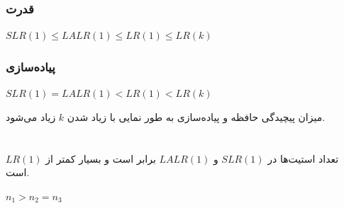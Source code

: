 \documentclass{article}
\begin{document}
\section{}%
\subsection{}
\subsubsection{قدرت}
\begin{latin}
$
SLR(1) \le LALR(1) \le LR(1) \le LR(k)
$
\end{latin}
\subsubsection{پیاده‌سازی}
\begin{latin}
$
SLR(1) = LALR(1) < LR(1) < LR(k)
$
\end{latin}
میزان پیچیدگی حافظه و پیاده‌سازی به طور نمایی با زیاد شدن $k$ زیاد می‌شود.


\section{}%
تعداد استیت‌ها در $SLR(1)$ و $LALR(1)$ برابر است و بسیار کمتر از $LR(1)$ است.
\begin{latin}
$
n_1 > n_2 = n_3
$
\end{latin}
\end{document}
